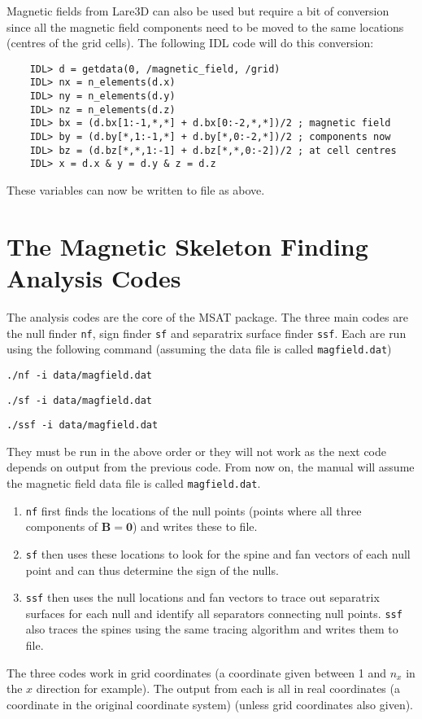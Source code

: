 \documentclass[12pt]{article}
\renewcommand{\vec}[1]{\mathbf{#1}}
\begin{document}
      Magnetic fields from Lare3D can also be used but require a bit of conversion since all the magnetic field components need to be moved to the same locations (centres of the grid cells). The following IDL code will do this conversion:

      \begin{verbatim}
    IDL> d = getdata(0, /magnetic_field, /grid)
    IDL> nx = n_elements(d.x)
    IDL> ny = n_elements(d.y)
    IDL> nz = n_elements(d.z)
    IDL> bx = (d.bx[1:-1,*,*] + d.bx[0:-2,*,*])/2 ; magnetic field
    IDL> by = (d.by[*,1:-1,*] + d.by[*,0:-2,*])/2 ; components now
    IDL> bz = (d.bz[*,*,1:-1] + d.bz[*,*,0:-2])/2 ; at cell centres
    IDL> x = d.x & y = d.y & z = d.z
      \end{verbatim}

      These variables can now be written to file as above.

  \section{The Magnetic Skeleton Finding Analysis Codes}

    The analysis codes are the core of the MSAT package. The three main codes are the null finder \texttt{nf}, sign finder \texttt{sf} and separatrix surface finder \texttt{ssf}. Each are run using the following command (assuming the data file is called \texttt{magfield.dat})

    \texttt{./nf -i data/magfield.dat}

    \texttt{./sf -i data/magfield.dat}
    
    \texttt{./ssf -i data/magfield.dat}

    They must be run in the above order or they will not work as the next code depends on output from the previous code. From now on, the manual will assume the magnetic field data file is called \texttt{magfield.dat}.

    \begin{enumerate}
      \item \texttt{nf} first finds the locations of the null points (points where all three components of \( \vec{B} = \vec{0} \)) and writes these to file.
      \item \texttt{sf} then uses these locations to look for the spine and fan vectors of each null point and can thus determine the sign of the nulls.
      \item \texttt{ssf} then uses the null locations and fan vectors to trace out separatrix surfaces for each null and identify all separators connecting null points. \texttt{ssf} also traces the spines using the same tracing algorithm and writes them to file.
    \end{enumerate}
    The three codes work in grid coordinates (a coordinate given between 1 and \( n_x \) in the \( x \) direction for example). The output from each is all in real coordinates (a coordinate in the original coordinate system) (unless grid coordinates also given).
\end{document}

